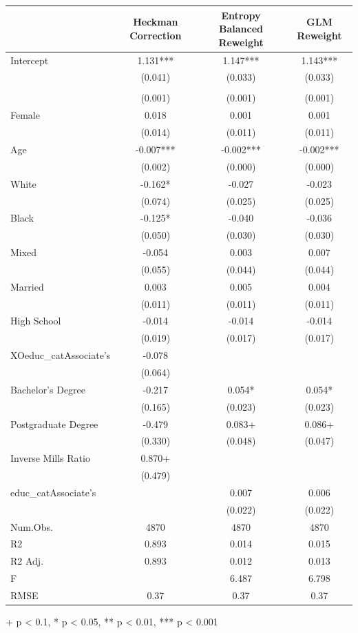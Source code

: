 \documentclass[
]{article}
\begin{document}
\begin{table}[t]
\fontsize{12.0pt}{14.4pt}\selectfont
\begin{tabular*}{\linewidth}{@{\extracolsep{\fill}}lccc}
\toprule
  & Heckman Correction & Entropy Balanced Reweight & GLM Reweight \\ 
\midrule\addlinespace[2.5pt]
Intercept & 1.131*** & 1.147*** & 1.143*** \\ 
 & (0.041) & (0.033) & (0.033) \\ 
{\cellcolor[HTML]{ADD8E6}{Unemployment Duration (Months)}} & {\cellcolor[HTML]{ADD8E6}{-0.006***}} & {\cellcolor[HTML]{ADD8E6}{-0.006***}} & {\cellcolor[HTML]{ADD8E6}{-0.006***}} \\ 
 & (0.001) & (0.001) & (0.001) \\ 
Female & 0.018 & 0.001 & 0.001 \\ 
 & (0.014) & (0.011) & (0.011) \\ 
Age & -0.007*** & -0.002*** & -0.002*** \\ 
 & (0.002) & (0.000) & (0.000) \\ 
White & -0.162* & -0.027 & -0.023 \\ 
 & (0.074) & (0.025) & (0.025) \\ 
Black & -0.125* & -0.040 & -0.036 \\ 
 & (0.050) & (0.030) & (0.030) \\ 
Mixed & -0.054 & 0.003 & 0.007 \\ 
 & (0.055) & (0.044) & (0.044) \\ 
Married & 0.003 & 0.005 & 0.004 \\ 
 & (0.011) & (0.011) & (0.011) \\ 
High School & -0.014 & -0.014 & -0.014 \\ 
 & (0.019) & (0.017) & (0.017) \\ 
XOeduc\_catAssociate's & -0.078 &  &  \\ 
 & (0.064) &  &  \\ 
Bachelor's Degree & -0.217 & 0.054* & 0.054* \\ 
 & (0.165) & (0.023) & (0.023) \\ 
Postgraduate Degree & -0.479 & 0.083+ & 0.086+ \\ 
 & (0.330) & (0.048) & (0.047) \\ 
Inverse Mills Ratio & 0.870+ &  &  \\ 
 & (0.479) &  &  \\ 
educ\_catAssociate's &  & 0.007 & 0.006 \\ 
{} & {} & {(0.022)} & {(0.022)} \\ 
Num.Obs. & 4870 & 4870 & 4870 \\ 
R2 & 0.893 & 0.014 & 0.015 \\ 
R2 Adj. & 0.893 & 0.012 & 0.013 \\ 
F &  & 6.487 & 6.798 \\ 
RMSE & 0.37 & 0.37 & 0.37 \\ 
\bottomrule
\end{tabular*}
\begin{minipage}{\linewidth}
+ p < 0.1, * p < 0.05, ** p < 0.01, *** p < 0.001\\
\end{minipage}
\end{table}
\end{document}
